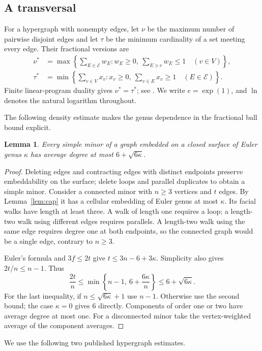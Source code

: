 \documentclass[11pt]{article}
\newtheorem{lemma}[theorem]{Lemma}
\theoremstyle{remark}
\begin{document}
\subsection{A transversal}

For a hypergraph with nonempty edges, let $\nu$ be the maximum number of
pairwise disjoint edges and let $\tau$ be the minimum cardinality of a set
meeting every edge. Their fractional versions are
\begin{align*}
\nu^*&=\max\left\{\sum_{E\in\mathcal E}w_E:
 w_E\ge0,\ \sum_{E\ni v}w_E\le1\quad(v\in V)\right\},\\
\tau^*&=\min\left\{\sum_{v\in V}x_v:
 x_v\ge0,\ \sum_{v\in E}x_v\ge1\quad(E\in\mathcal E)\right\}.
\end{align*}
Finite linear-program duality gives $\nu^*=\tau^*$; see
\cite[p.~1]{Bousquet}. We write $e=\exp(1)$, and $\ln$ denotes the natural
logarithm throughout.

The following density estimate makes the genus dependence in the
fractional ball bound explicit.
\begin{lemma}\label{lem:density}
Every simple minor of a graph embedded on a closed surface of Euler genus
$\kappa$ has average degree at most $6+\sqrt{6\kappa}$.
\end{lemma}
\begin{proof}
Deleting edges and contracting edges with distinct endpoints preserve
embeddability on the surface; delete loops and parallel duplicates to
obtain a simple minor. Consider a connected minor with $n\ge3$ vertices
and $t$ edges. By Lemma~\ref{lem:cap} it has a cellular embedding of Euler
genus at most $\kappa$. Its facial walks have length at least three.
A walk of length one requires a loop; a length-two walk using different
edges requires parallels. A length-two walk using the same edge requires
degree one at both endpoints, so the connected graph would be a single
edge, contrary to $n\ge3$.

Euler's formula and $3f\le2t$ give $t\le3n-6+3\kappa$.
Simplicity also gives $2t/n\le n-1$. Thus
\[
\frac{2t}{n}\le\min\left\{n-1,\ 6+\frac{6\kappa}{n}\right\}
 \le6+\sqrt{6\kappa}.
\]
For the last inequality, if $n\le\sqrt{6\kappa}+1$ use $n-1$.
Otherwise use the second bound; the case $\kappa=0$ gives $6$ directly.
Components of order one or two have average degree at most one.
For a disconnected minor take the vertex-weighted average of the
component averages.
\end{proof}

We use the following two published hypergraph estimates.
\end{document}

